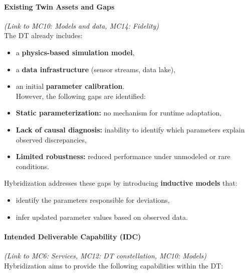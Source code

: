 \documentclass[
]{article}
\providecommand{\tightlist}{%
  \setlength{\itemsep}{0pt}\setlength{\parskip}{0pt}}
\begin{document}
\paragraph{Existing Twin Assets and
Gaps}\label{existing-twin-assets-and-gaps}

\emph{(Link to MC10: Models and data, MC14: Fidelity)}\\
The DT already includes:

\begin{itemize}
\tightlist
\item
  a \textbf{physics-based simulation model},
\item
  a \textbf{data infrastructure} (sensor streams, data lake),
\item
  an initial \textbf{parameter calibration}.\\
  However, the following gaps are identified:
\item
  \textbf{Static parameterization:} no mechanism for runtime adaptation,
\item
  \textbf{Lack of causal diagnosis:} inability to identify which
  parameters explain observed discrepancies,
\item
  \textbf{Limited robustness:} reduced performance under unmodeled or
  rare conditions.
\end{itemize}

Hybridization addresses these gaps by introducing \textbf{inductive
models} that:

\begin{itemize}
\tightlist
\item
  identify the parameters responsible for deviations,
\item
  infer updated parameter values based on observed data.
\end{itemize}

\paragraph{Intended Deliverable Capability
(IDC)}\label{intended-deliverable-capability-idc}

\emph{(Link to MC6: Services, MC12: DT constellation, MC10: Models)}\\
Hybridization aims to provide the following capabilities within the DT:
\end{document}
